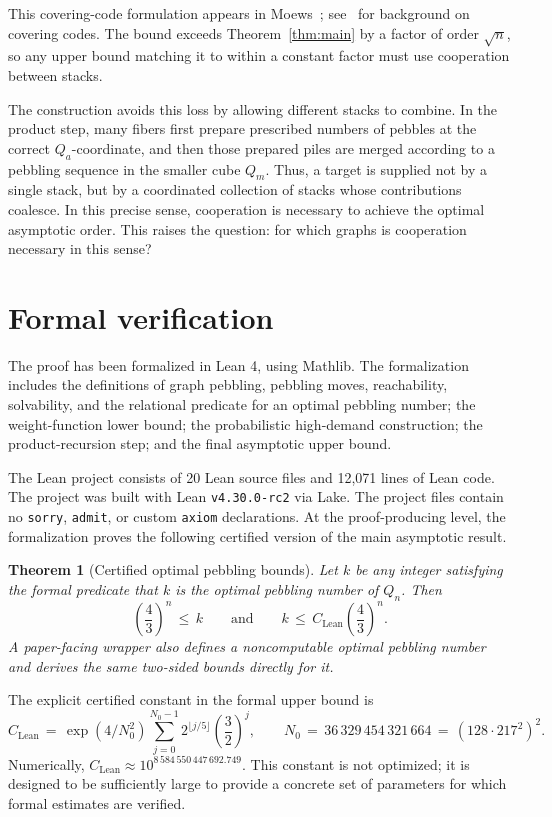 \documentclass[11pt]{article}
\theoremstyle{plain}
\newtheorem{theorem}{Theorem}
\theoremstyle{definition}
\begin{document}
This covering-code formulation appears in Moews~\cite{Moews}; see~\cite{CoveringCodes}
for background on covering codes.  The bound exceeds Theorem~\ref{thm:main} by a factor of
order $\sqrt n$, so any upper bound matching it to within a constant factor must use
cooperation between stacks.

The construction avoids this loss by allowing different stacks to combine.  In the
product step, many fibers first prepare prescribed numbers of pebbles at the correct
$Q_a$-coordinate, and then those prepared piles are merged according to a pebbling
sequence in the smaller cube $Q_m$. Thus, a target is supplied not by a single stack, but
by a coordinated collection of stacks whose contributions coalesce.  In this precise
sense, cooperation is necessary to achieve the optimal asymptotic order.
This raises the question: for which graphs is cooperation necessary in this sense?

\section*{Formal verification}

The proof has been formalized in Lean 4, using Mathlib.  The formalization includes the
definitions of graph pebbling, pebbling moves, reachability, solvability, and the
relational predicate for an optimal pebbling number; the weight-function lower bound; the
probabilistic high-demand construction; the product-recursion step; and the final
asymptotic upper bound.

The Lean project consists of 20 Lean source files and 12,071 lines of Lean code.  The
project was built with Lean \texttt{v4.30.0-rc2} via Lake.  The project files contain no
\texttt{sorry}, \texttt{admit}, or custom \texttt{axiom} declarations.  At the
proof-producing level, the formalization proves the following certified version of the
main asymptotic result.

\begin{theorem}[Certified optimal pebbling bounds]\label{thm:certified}
Let $k$ be any integer satisfying the formal predicate that $k$ is the optimal
pebbling number of $Q_n$. Then
\[
\left(\frac43\right)^n \,\le\, k
\qquad\text{and}\qquad
k \,\le\, C_{\mathrm{Lean}}\left(\frac43\right)^n.
\]
A paper-facing wrapper also defines a noncomputable optimal pebbling number and derives
the same two-sided bounds directly for it.
\end{theorem}
The explicit certified constant in the formal upper bound is
\[
C_{\mathrm{Lean}}
\,=\,
\exp(4/N_0^2)
\sum_{j=0}^{N_0-1}2^{\lfloor j/5\rfloor}
\left(\frac32\right)^j,
\qquad
N_0\,=\,36\,329\,454\,321\,664\,=\,(128\cdot 217^2)^2.
\]
Numerically, $C_{\mathrm{Lean}}\approx 10^{8\,584\,550\,447\,692.749}$.
\label{const:clean}
This constant is not optimized; it is designed to be sufficiently large to provide a
concrete set of parameters for which formal estimates are verified.
\end{document}
